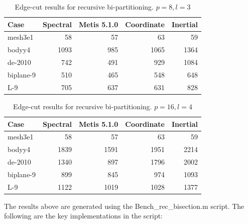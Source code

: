 \documentclass[unicode,11pt,a4paper,oneside,numbers=endperiod,openany]{scrartcl}
\begin{document}
\begin{table}[h]
\caption{Edge-cut results for recursive bi-partitioning. ${p = 8, l = 3}$}
\centering
\begin{tabular}{l|r|r|r|r} \hline\hline 
 Case            &  Spectral             &  Metis 5.1.0    & Coordinate & Inertial  \\ \hline
 mesh3e1         &          58             &         57        &     63       &     59      \\             
 bodyy4        &              1093         &           985      &     1065       &      1364     \\ 
 de-2010            &         742              &        491         &  929          &     1084      \\ 
 biplane-9          &         510              &      465           &   548         &       648    \\ 
 L-9           &         705              &      637           &       631     &       828    \\  \hline \hline
\end{tabular}
\label{table:Rec_bisection8}
\end{table}


\begin{table}[h]
\caption{Edge-cut results for recursive bi-partitioning. ${p = 16, l = 4}$}
\centering
\begin{tabular}{l|r|r|r|r} \hline\hline 
 Case            &  Spectral             &  Metis 5.1.0    & Coordinate & Inertial  \\ \hline
 mesh3e1         &       58                &        57         &     63       &     59      \\             
 bodyy4        &        1839               &        1591         &   1951         &      2214     \\ 
 de-2010            &         1340              &        897         &  1796          &     2002      \\ 
 biplane-9          &         899              &        845         &   974         &      1093     \\ 
 L-9           &           1122            &        1019         &    1028        &      1377     \\  \hline \hline
\end{tabular}
\label{table:Rec_bisection16}
\end{table}

The results above are generated using the Bench\_rec\_bisection.m script. The following are the key implementations in the script: \\
\end{document}
